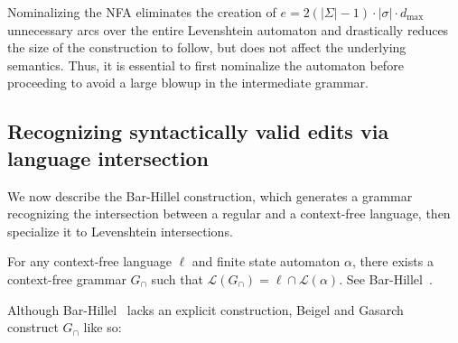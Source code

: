 \documentclass[sigplan,acmsmall,nonacm,screen]{acmart}\settopmatter{printfolios=false,printccs=false,printacmref=false}
\begin{document}

  Nominalizing the NFA eliminates the creation of $e=2(|\Sigma| - 1)\cdot|\sigma|\cdot d_\max$ unnecessary arcs over the entire Levenshtein automaton and drastically reduces the size of the construction to follow, but does not affect the underlying semantics. Thus, it is essential to first nominalize the automaton before proceeding to avoid a large blowup in the intermediate grammar.

  \subsection{Recognizing syntactically valid edits via language intersection}\label{sec:lev_bh}

  We now describe the Bar-Hillel construction, which generates a grammar recognizing the intersection between a regular and a context-free language, then specialize it to Levenshtein intersections.

  \begin{lemma}\label{lemma:bar-hillel}
  For any context-free language $\ell$ and finite state automaton $\alpha$, there exists a context-free grammar $G_\cap$ such that $\mathcal{L}(G_\cap) = \ell \cap \mathcal{L}(\alpha)$. See Bar-Hillel~\cite{bar1961formal}.
  \end{lemma}

  \noindent Although Bar-Hillel~\cite{bar1961formal} lacks an explicit construction, Beigel and Gasarch~\cite{beigelproof} construct $G_\cap$ like so:\vspace{-2pt}
\end{document}
